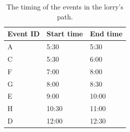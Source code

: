 \begin{table}[!h]
  \centering
  \begin{tabular}{@{}lll@{}} \toprule
     Event ID & Start time & End time \\ \midrule
     A & 5:30 & 5:30 \\
     C & 5:30 & 6:00 \\
     F & 7:00 & 8:00 \\
     G & 8:00 & 8:30 \\
     E & 9:00 & 10:00 \\
     H & 10:30 & 11:00 \\
     D & 12:00 & 12:30 \\
    \bottomrule
  \end{tabular}
  \caption{The timing of the events in the lorry's path.}
  \label{tab:timing}
\end{table}







